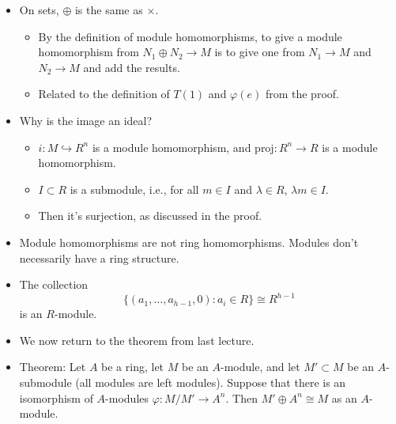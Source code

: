 \documentclass[../notes.tex]{subfiles}
\begin{document}
\begin{itemize}
\begin{proof}
        We now check that $T$ is injective. Since $R$ is an integral domain, $d$ is unique. Thus, since distinct inputs map to distinct outputs, $T$ is 1-1. It follows that $\ker(T)=0$.\par
        It follows that $M'\oplus R\cong M$.\par
        The rest of the proof follows by induction on $h\geq 0$. In particular, assume $h>0$ and assume that we've proved the claim for $h-1$. Then $M'\cong R^\ell$ for $0\leq\ell\leq h-1$. Case 1: $M'=M$ and Case 2: $M\cong M'\oplus R\cong R^\ell\oplus R=R^{\ell+1}$.
    \end{proof}
    \item On sets, $\oplus$ is the same as $\times$.
    \begin{itemize}
        \item By the definition of module homomorphisms, to give a module homomorphism from $N_1\oplus N_2\to M$ is to give one from $N_1\to M$ and $N_2\to M$ and add the results.
        \item Related to the definition of $T(1)$ and $\varphi(e)$ from the proof.
    \end{itemize}
    \item Why is the image an ideal?
    \begin{itemize}
        \item $i:M\hookrightarrow R^n$ is a module homomorphism, and $\text{proj}:R^n\to R$ is a module homomorphism.
        \item $I\subset R$ is a submodule, i.e., for all $m\in I$ and $\lambda\in R$, $\lambda m\in I$.
        \item Then it's surjection, as discussed in the proof.
    \end{itemize}
    \item Module homomorphisms are not ring homomorphisms. Modules don't necessarily have a ring structure.
    \item The collection
    \begin{equation*}
        \{(a_1,\dots,a_{h-1},0):a_i\in R\} \cong R^{h-1}
    \end{equation*}
    is an $R$-module.
    \item We now return to the theorem from last lecture.
    \item Theorem: Let $A$ be a ring, let $M$ be an $A$-module, and let $M'\subset M$ be an $A$-submodule (all modules are left modules). Suppose that there is an isomorphism of $A$-modules $\varphi:M/M'\to A^n$. Then $M'\oplus A^n\cong M$ as an $A$-module.

\end{itemize}
\end{document}
